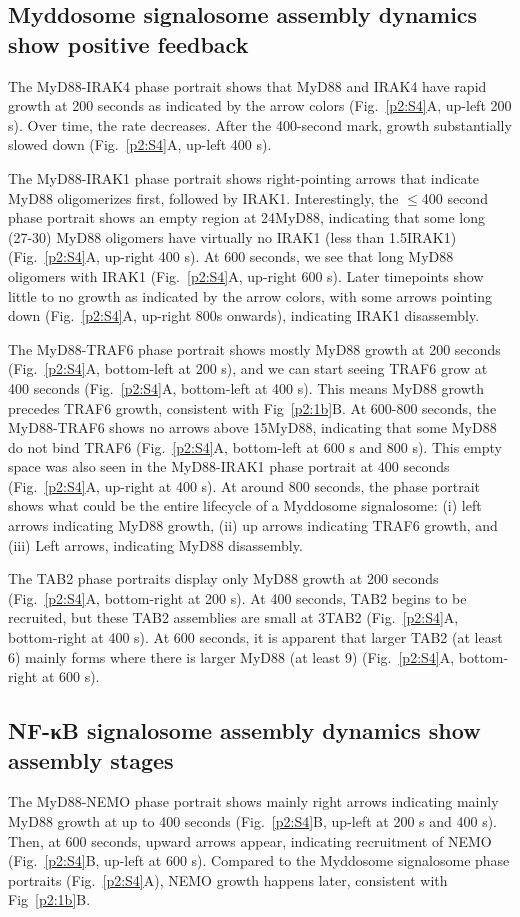 \subsection{Myddosome signalosome assembly dynamics show positive feedback}
The MyD88-IRAK4 phase portrait shows that MyD88 and IRAK4 have rapid growth at 200 seconds as indicated by the arrow colors (Fig.~\ref{p2:S4}A, up-left 200 s). Over time, the rate decreases. After the 400-second mark, growth substantially slowed down (Fig.~\ref{p2:S4}A, up-left 400 s).

The MyD88-IRAK1 phase portrait shows right-pointing arrows that indicate MyD88 oligomerizes first, followed by IRAK1. Interestingly, the $\le$400 second phase portrait shows an empty region at 24\times MyD88, indicating that some long (27-30\times) MyD88 oligomers have virtually no IRAK1 (less than 1.5\times IRAK1) (Fig.~\ref{p2:S4}A, up-right 400 s). At 600 seconds, we see that long MyD88 oligomers with IRAK1 (Fig.~\ref{p2:S4}A, up-right 600 s). Later timepoints show little to no growth as indicated by the arrow colors, with some arrows pointing down (Fig.~\ref{p2:S4}A, up-right 800s onwards), indicating IRAK1 disassembly.

The MyD88-TRAF6 phase portrait shows mostly MyD88 growth at 200 seconds (Fig.~\ref{p2:S4}A, bottom-left at 200 s), and we can start seeing TRAF6 grow at 400 seconds (Fig.~\ref{p2:S4}A, bottom-left at 400 s). This means MyD88 growth precedes TRAF6 growth, consistent with Fig~\ref{p2:1b}B. At 600-800 seconds, the MyD88-TRAF6 shows no arrows above 15\times MyD88, indicating that some MyD88 do not bind TRAF6 (Fig.~\ref{p2:S4}A, bottom-left at 600 s and 800 s). This empty space was also seen in the MyD88-IRAK1 phase portrait at 400 seconds (Fig.~\ref{p2:S4}A, up-right at 400 s). At around 800 seconds, the phase portrait shows what could be the entire lifecycle of a Myddosome signalosome: (i) left arrows indicating MyD88 growth, (ii) up arrows indicating TRAF6 growth, and (iii) Left arrows, indicating MyD88 disassembly.

The TAB2 phase portraits display only MyD88 growth at 200 seconds (Fig.~\ref{p2:S4}A, bottom-right at 200 s). At 400 seconds, TAB2 begins to be recruited, but these TAB2 assemblies are small at 3\times TAB2 (Fig.~\ref{p2:S4}A, bottom-right at 400 s). At 600 seconds, it is apparent that larger TAB2 (at least 6\times) mainly forms where there is larger MyD88 (at least 9\times) (Fig.~\ref{p2:S4}A, bottom-right at 600 s).

\subsection{NF-κB signalosome assembly dynamics show assembly stages}
The MyD88-NEMO phase portrait shows mainly right arrows indicating mainly MyD88 growth at up to 400 seconds (Fig.~\ref{p2:S4}B, up-left at 200 s and 400 s). Then, at 600 seconds, upward arrows appear, indicating recruitment of NEMO (Fig.~\ref{p2:S4}B, up-left at 600 s). Compared to the Myddosome signalosome phase portraits (Fig.~\ref{p2:S4}A), NEMO growth happens later, consistent with Fig~\ref{p2:1b}B. 

